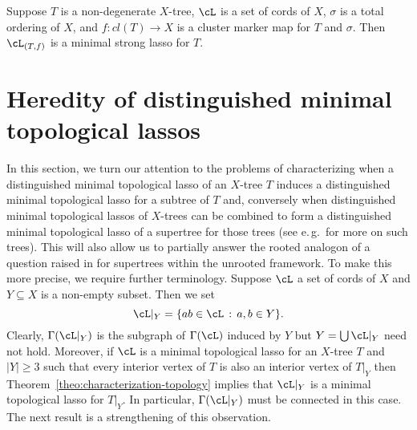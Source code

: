 \begin{cor}
  \label{corollary:strong-lasso-characterization}
  Suppose $T$ is a non-degenerate $X$-tree, $\cL$ is a set of cords of $X$,
  $\sigma$ is a total ordering of $X$, and $f:cl(T)\to X$ is a cluster marker
  map for $T$ and $\sigma$.  Then $\cL_{(T,f)}$ is a minimal strong lasso for
  $T$.
\end{cor}


\section{Heredity of distinguished minimal topological lassos}
\label{sec:subtree}

In this section, we turn our attention to the problems of characterizing when
a distinguished minimal topological lasso of an $X$-tree $T$ induces a
distinguished minimal topological lasso for a subtree of $T$ and, conversely
when distinguished minimal topological lassos of $X$-trees can be combined to
form a distinguished minimal topological lasso of a supertree for those trees
(see e.\,g.\,\cite{BE00} for more on such trees). This will also allow us to
partially answer the rooted analogon of a question raised in \cite{DHS11} for
supertrees within the unrooted framework.  To make this more precise, we
require further terminology.  Suppose $\cL$ a set of cords of $X$ and
$Y\subseteq X$ is a non-empty subset. Then we set
$$
\cL|_Y=\{ab\in\cL\,:\, a,b\in Y\}.
$$
Clearly, $\Gamma(\cL|_Y)$ is the subgraph of $\Gamma(\cL)$ induced by $Y$ but
$Y=\bigcup \cL|_Y$ need not hold. Moreover, if $\cL$ is a minimal topological
lasso for an $X$-tree $T$ and $|Y|\geq 3$ such that every interior vertex of
$T$ is also an interior vertex of $T|_Y$ then
Theorem~\ref{theo:characterization-topology} implies that $\cL|_Y$ is a
minimal topological lasso for $T|_Y$. In particular, $\Gamma(\cL|_Y)$ must be
connected in this case.  The next result is a strengthening of this
observation.

